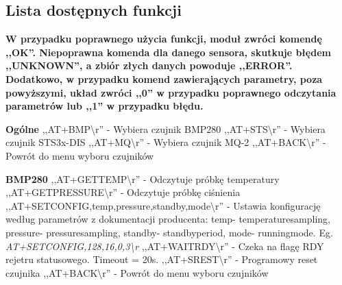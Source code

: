\subsection{Lista dostępnych funkcji}
\textbf{W przypadku poprawnego użycia funkcji, moduł zwróci komendę ,,OK''. Niepoprawna komenda dla danego sensora, skutkuje błędem ,,UNKNOWN'', a zbiór złych danych powoduje ,,ERROR''. Dodatkowo, w przypadku komend zawierających parametry, poza powyższymi, układ zwróci ,,0'' w przypadku poprawnego odczytania parametrów lub ,,1'' w przypadku błędu.}\newline\newline

\textbf{Ogólne}\newline
   ,,AT+BMP\textbackslash r'' - Wybiera czujnik BMP280\newline
   ,,AT+STS\textbackslash r'' - Wybiera czujnik STS3x-DIS\newline
   ,,AT+MQ\textbackslash r'' - Wybiera czujnik MQ-2\newline
   ,,AT+BACK\textbackslash r'' - Powrót do menu wyboru czujników\newline

\textbf{BMP280}\newline
   ,,AT+GETTEMP\textbackslash r'' - Odczytuje próbkę temperatury\newline
   ,,AT+GETPRESSURE\textbackslash r'' - Odczytuje próbkę ciśnienia\newline
   ,,AT+SETCONFIG,\lbrack temp\rbrack,\lbrack pressure\rbrack,\lbrack standby\rbrack,\lbrack mode\rbrack\textbackslash r'' - Ustawia konfigurację według parametrów z dokumentacji producenta: \lbrack temp\rbrack - temperature\textunderscore sampling, \lbrack pressure\rbrack - pressure\textunderscore sampling, \lbrack standby\rbrack - standby\textunderscore period, \lbrack mode\rbrack - running\textunderscore mode. Eg. \textit{AT+SETCONFIG,128,16,0,3\textbackslash r}\newline
   ,,AT+WAITRDY\textbackslash r'' - Czeka na flagę RDY rejetru statusowego. Timeout = 20s.\newline
   ,,AT+SREST\textbackslash r'' - Programowy reset czujnika\newline
   ,,AT+BACK\textbackslash r'' - Powrót do menu wyboru czujników\newline

